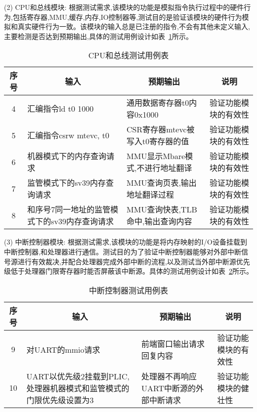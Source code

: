 (2) CPU和总线模块: 根据测试需求,该模块的功能是模拟指令执行过程中的硬件行为,包括寄存器,MMU,缓存,内存,IO控制器等,测试目的是验证该模块的硬件行为模拟和真实硬件行为一致。该模块的输入总是已注册的指令,不会有其他未定义输入,主要检测是否达到预期输出,具体的测试用例设计如表~\ref{tab:test2}所示。
\begin{table}[h]
    \centering
    \caption{CPU和总线测试用例表}
    \label{tab:test2}
    \begin{tabular}{clll}
      \toprule
      \multicolumn{1}{c}{序号} & \multicolumn{1}{c}{输入} & \multicolumn{1}{c}{预期输出} &\multicolumn{1}{c}{说明}\\
      \midrule
  4	& \multicolumn{1}{m{3.5cm}}{汇编指令ld t0 1000} & \multicolumn{1}{m{3.5cm}}{通用数据寄存器t0内容0x1000} & \multicolumn{1}{m{3.5cm}}{验证功能模块的有效性}\\
  \hline
  5	& \multicolumn{1}{m{3.5cm}}{汇编指令csrw mtevc, t0} & \multicolumn{1}{m{3.5cm}}{CSR寄存器mtevc被写入t0寄存器的值} & \multicolumn{1}{m{3.5cm}}{验证功能模块的有效性}\\
  \hline
  6	& \multicolumn{1}{m{3.5cm}}{机器模式下的内存查询请求} & \multicolumn{1}{m{3.5cm}}{MMU显示Mbare模式,不进行地址翻译} & \multicolumn{1}{m{3.5cm}}{验证功能模块的有效性}\\
  \hline
  7	& \multicolumn{1}{m{3.5cm}}{监管模式下的sv39内存查询请求} & \multicolumn{1}{m{3.5cm}}{MMU查询页表,输出地址翻译过程} & \multicolumn{1}{m{3.5cm}}{验证功能模块的有效性}\\
  \hline
  8	& \multicolumn{1}{m{3.5cm}}{和序号7同一地址的监管模式下的sv39内存查询请求} & \multicolumn{1}{m{3.5cm}}{MMU查询快表,TLB命中,输出查询内容} & \multicolumn{1}{m{3.5cm}}{验证功能模块的有效性}\\
      \bottomrule
    \end{tabular}
\end{table}

(3) 中断控制器模块: 根据测试需求,该模块的功能是将内存映射的I/O设备挂载到中断控制器,和处理器进行通信。测试目的为了验证中断控制器能够对外部中断信号源进行有效裁决,并配合处理器完成外部中断的流程,以及测试当外部中断源优先级低于处理器门限寄存器时能否屏蔽该中断源。具体的测试用例设计如表~\ref{tab:test3}所示。
\begin{table}[h]
    \centering
    \caption{中断控制器测试用例表}
    \label{tab:test3}
    \begin{tabular}{clll}
      \toprule
      \multicolumn{1}{c}{序号} & \multicolumn{1}{c}{输入} & \multicolumn{1}{c}{预期输出} &\multicolumn{1}{c}{说明}\\
      \midrule
  9	& \multicolumn{1}{m{3.5cm}}{对UART的mmio请求} & \multicolumn{1}{m{3.5cm}}{前端窗口输出请求回复内容} & \multicolumn{1}{m{3.5cm}}{验证功能模块的有效性}\\
  \hline
  10	& \multicolumn{1}{m{3.5cm}}{UART以优先级2挂载到PLIC,处理器机器模式和监管模式的门限优先级设置为3} & \multicolumn{1}{m{3.5cm}}{处理器不再响应UART中断源的外部中断请求} & \multicolumn{1}{m{3.5cm}}{验证功能模块的健壮性}\\
  \bottomrule
    \end{tabular}
\end{table}


